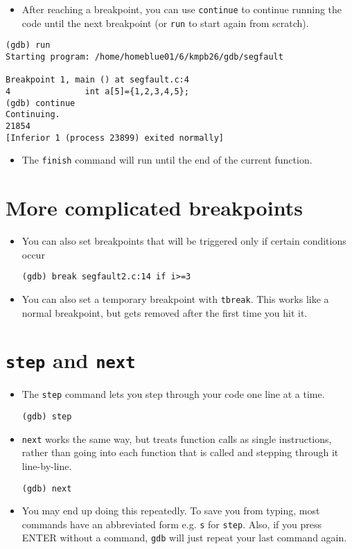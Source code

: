 \documentclass{article}
\begin{document}
\begin{itemize}
\item After reaching a breakpoint, you can use \verb!continue! to continue running the code until the next breakpoint (or \verb!run! to start again from scratch).
\end{itemize}
\begin{verbatim}
(gdb) run
Starting program: /home/homeblue01/6/kmpb26/gdb/segfault 

Breakpoint 1, main () at segfault.c:4
4               int a[5]={1,2,3,4,5};
(gdb) continue 
Continuing.
21854
[Inferior 1 (process 23899) exited normally]
\end{verbatim}
\begin{itemize}
\item The \verb!finish! command will run until the end of the current function.
\end{itemize}



\section{More complicated breakpoints}
\begin{itemize}
\item You can also set breakpoints that will be triggered only if certain conditions occur
\begin{verbatim}
(gdb) break segfault2.c:14 if i>=3
\end{verbatim}
\item You can also set a temporary breakpoint with \verb!tbreak!. This works like a normal breakpoint, but gets removed after the first time you hit it.
\end{itemize}



\section{\texttt{step} and \texttt{next}}
\begin{itemize}
\item The \verb!step! command lets you step through your code one line at a time.
\begin{verbatim}
(gdb) step
\end{verbatim}
\item \verb!next! works the same way, but treats function calls as single instructions, rather than going into each function that is called and stepping through it line-by-line.
\begin{verbatim}
(gdb) next
\end{verbatim}
\item You may end up doing this repeatedly. To save you from typing, most commands have an abbreviated form e.g. \verb!s! for \verb!step!. Also, if you press ENTER without a command, \verb!gdb! will just repeat your last command again.
\end{itemize}
\end{document}
